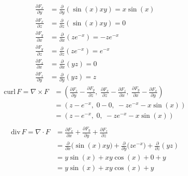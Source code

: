 \begin{solution}
	$$
		\begin{aligned}
			\frac{\partial F_x}{\partial y} & = \frac{\partial}{\partial y} (\sin(x) xy) = x \sin(x) \\
			\frac{\partial F_x}{\partial z} & = \frac{\partial}{\partial z} (\sin(x) xy) = 0         \\
			\frac{\partial F_y}{\partial x} & = \frac{\partial}{\partial x} (ze^{-x}) = -ze^{-x}     \\
			\frac{\partial F_y}{\partial z} & = \frac{\partial}{\partial z} (ze^{-x}) = e^{-x}       \\
			\frac{\partial F_z}{\partial x} & = \frac{\partial}{\partial x} (yz)  = 0                \\
			\frac{\partial F_z}{\partial y} & = \frac{\partial}{\partial y} (yz)  = z
		\end{aligned}
	$$
	$$
		\begin{aligned}
			\text{curl}\, F = \nabla \times F & = \left(
			\frac{\partial F_z}{\partial y} - \frac{\partial F_y}{\partial z},\;
			\frac{\partial F_x}{\partial z} - \frac{\partial F_z}{\partial x},\;
			\frac{\partial F_y}{\partial x} - \frac{\partial F_x}{\partial y}
			\right)                                                                                         \\
			                                  & = \left( z - e^{-x},\; 0 - 0,\; -ze^{-x} - x\sin(x) \right) \\
			                                  & = \left( z - e^{-x},\; 0,\; -ze^{-x} - x\sin(x) \right)     \\[1em]
		\end{aligned}
	$$
	$$
		\begin{aligned}
			\text{div}\, F = \nabla \cdot F & = \frac{\partial F_x}{\partial x} + \frac{\partial F_y}{\partial y} + \frac{\partial F_z}{\partial z}                             \\
			                                & = \frac{\partial}{\partial x}\big(\sin(x)xy\big) + \frac{\partial}{\partial y}\big(ze^{-x}\big) + \frac{\partial}{\partial z}(yz) \\
			                                & = y\sin(x) + xy\cos(x) + 0 + y                                                                                                    \\
			                                & = y\sin(x) + xy\cos(x) + y
		\end{aligned}
	$$
\end{solution}

